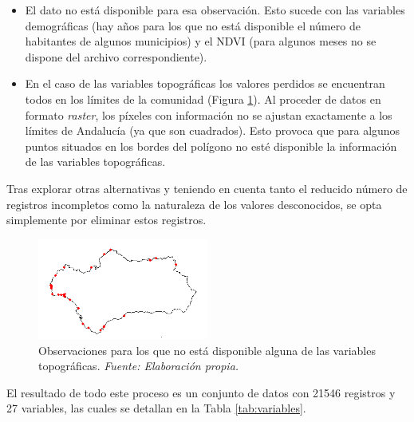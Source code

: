 \documentclass[12pt,a4paper,]{book}
\numberwithin{dummy}{section}
\theoremstyle{ocrenumbox}
\theoremstyle{blacknumex}
\theoremstyle{blacknumbox}
\theoremstyle{ocrenum}
\theoremstyle{ocrenum}
\begin{document}
\begin{itemize}
\item
  El dato no está disponible para esa observación. Esto sucede con las
  variables demográficas (hay años para los que no está disponible el
  número de habitantes de algunos municipios) y el NDVI (para algunos
  meses no se dispone del archivo correspondiente).
\item
  En el caso de las variables topográficas los valores perdidos se
  encuentran todos en los límites de la comunidad (Figura
  \ref{fig:nas_topograficas}). Al proceder de datos en formato
  \emph{raster}, los píxeles con información no se ajustan exactamente a
  los límites de Andalucía (ya que son cuadrados). Esto provoca que para
  algunos puntos situados en los bordes del polígono no esté disponible
  la información de las variables topográficas.
\end{itemize}

Tras explorar otras alternativas y teniendo en cuenta tanto el reducido
número de registros incompletos como la naturaleza de los valores
desconocidos, se opta simplemente por eliminar estos registros.

\begin{figure}[htb]
\centering
\includegraphics[width=0.5\textwidth]{graficos/nas_topograficas.png}
\caption[Observaciones para los que no está disponible alguna de las variables topográficas]{Observaciones para los que no está disponible alguna de las variables topográficas. \it Fuente: Elaboración propia.}
\label{fig:nas_topograficas}
\end{figure}

El resultado de todo este proceso es un conjunto de datos con 21546
registros y 27 variables, las cuales se detallan en la Tabla
\ref{tab:variables}.
\end{document}
